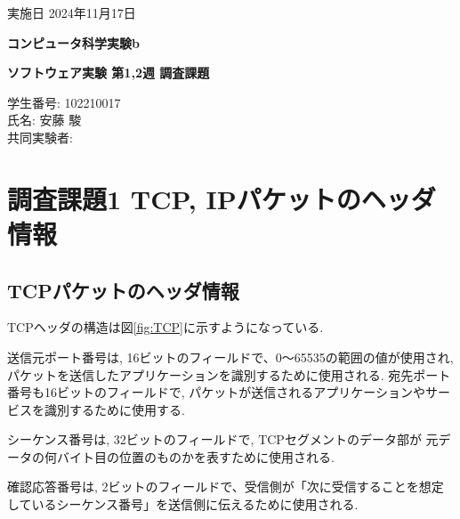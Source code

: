 \documentclass{ltjsarticle} %
\begin{document}
\thispagestyle{empty}
\begin{flushright}
{\large 実施日 2024年11月17日{\hspace{5cm}}} 
\end{flushright}

\vspace*{\fill}
\centering
{\Huge\bf コンピュータ科学実験b}
\vspace*{1cm}

{\huge\bf ソフトウェア実験 第1,2週 調査課題}
\vspace*{\fill}

\vspace*{\fill}

\vspace*{\fill}

\begin{flushright}
{\large 学生番号: 102210017} \\ %
{\large 氏名: 安藤 駿} \\

{\large 共同実験者:} \\
\end{flushright}

\clearpage

\addtocounter{page}{-1}
\raggedright
\setlength{\parindent}{1em}


\section{調査課題1 TCP, IPパケットのヘッダ情報}

\subsection{TCPパケットのヘッダ情報}

TCPヘッダの構造は図\ref{fig:TCP}に示すようになっている. 

送信元ポート番号は, 16ビットのフィールドで、0～65535の範囲の値が使用され, 
パケットを送信したアプリケーションを識別するために使用される. 
宛先ポート番号も16ビットのフィールドで, パケットが送信されるアプリケーションやサービスを識別するために使用する. 

シーケンス番号は, 32ビットのフィールドで, TCPセグメントのデータ部が
元データの何バイト目の位置のものかを表すために使用される. 

確認応答番号は, 2ビットのフィールドで、受信側が「次に受信することを想定しているシーケンス番号」を送信側に伝えるために使用される. 
\end{document}
